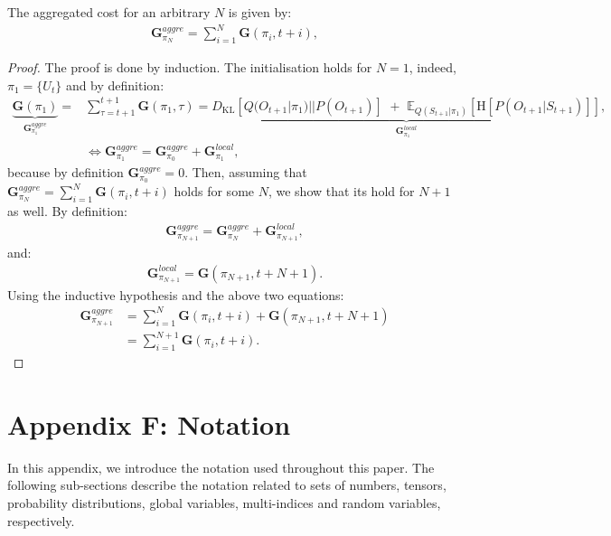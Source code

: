\documentclass[twoside,11pt]{article}
\begin{document}
\begin{lemma}\label{lemma_52}
The aggregated cost for an arbitrary $N$ is given by:
\begin{align}
\bm{G}^{aggre}_{\pi_N} = \sum_{i=1}^{N} \bm{G}(\pi_i, t + i),
\end{align}
\end{lemma}

\begin{proof}
The proof is done by induction. The initialisation holds for $N = 1$, indeed, $\pi_{1} = \{ U_t \}$ and by definition:
\begin{align}
\underbrace{\bm{G}(\pi_{1})}_{\bm{G}_{\pi_{1}}^{aggre}} = &\sum_{\tau = t+1}^{t+1} \bm{G}(\pi_{1}, \tau) = \underbrace{D_{\mathrm{KL}}[Q(O_{t+1}|\pi_{1})||P(O_{t+1})]\,\, +\,\, \mathbb{E}_{Q(S_{t+1}|\pi_{1})}[\text{H}[P(O_{t+1} | S_{t+1})]]}_{\bm{G}_{\pi_{1}}^{local}},\\
&\Leftrightarrow \bm{G}_{\pi_{1}}^{aggre} = \bm{G}_{\pi_{0}}^{aggre} + \bm{G}_{\pi_{1}}^{local},
\end{align}
because by definition $\bm{G}_{\pi_{0}}^{aggre} = 0$. Then, assuming that $\bm{G}^{aggre}_{\pi_N} = \sum_{i=1}^{N} \bm{G}(\pi_i, t + i)$ holds for some $N$, we show that its hold for $N+1$ as well. By definition:
\begin{align}
\bm{G}^{aggre}_{\pi_{N+1}} = \bm{G}^{aggre}_{\pi_N} + \bm{G}^{local}_{\pi_{N+1}},
\end{align}
and:
\begin{align}
\bm{G}^{local}_{\pi_{N+1}} = \bm{G}(\pi_{N+1},t+N+1).
\end{align}
Using the inductive hypothesis and the above two equations:
\begin{align}
\bm{G}^{aggre}_{\pi_{N+1}} &= \sum_{i=1}^{N} \bm{G}(\pi_i, t + i) + \bm{G}(\pi_{N+1},t+N+1)\\
&= \sum_{i=1}^{N+1} \bm{G}(\pi_i, t + i).
\end{align}
\end{proof}

\section*{Appendix F: Notation}

In this appendix, we introduce the notation used throughout this paper. The following sub-sections describe the notation related to sets of numbers, tensors, probability distributions, global variables, multi-indices and random variables, respectively.
\end{document}
